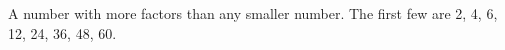  A number with more factors than any smaller number. The first 
few are 2, 4, 6, 12, 24, 36, 48, 60.
